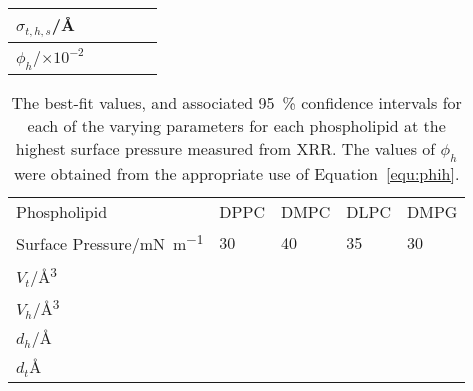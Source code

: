 \begin{table}
\begin{tabular}{l | l l l l}
        $\sigma_{t,h,s}$/\si{\angstrom} &  &  &  &  \\
        \midrule
        $\phi_h$/$\times 10^{-2}$ &  &  &  &  \\
        \bottomrule
    \end{tabular}
\end{table}
%
%
\begin{table}
    \centering
    \small
    \caption{The best-fit values, and associated \SI{95}{\percent} confidence intervals for each of the varying parameters for each phospholipid at the highest surface pressure measured from XRR. The values of $\phi_h$ were obtained from the appropriate use of Equation~\protect\ref{equ:phih}.}
    \label{tab:xrrref4}
    \begin{tabular}{l | l l l l}
        \toprule
        Phospholipid & DPPC & DMPC & DLPC & DMPG \\
        Surface Pressure/\si{\milli\newton\per\meter} & 30 & 40 & 35 & 30 \\
        \midrule
        $V_t$/\si{\angstrom\cubed} &  &  &  &  \\
        $V_h$/\si{\angstrom\cubed} &  &  &  &  \\
        $d_h$/\si{\angstrom} &  &  &  &  \\
        \midrule
        $d_t$\si{\angstrom} &  &  &  &  \\

\end{tabular}
\end{table}
